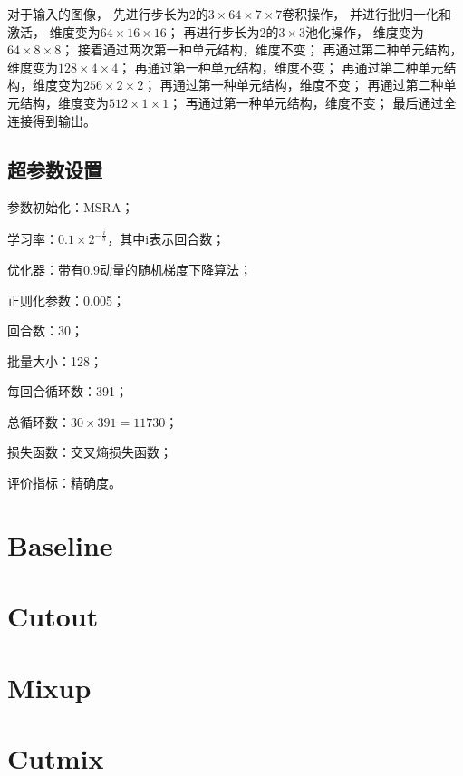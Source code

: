 \documentclass{article}
\begin{document}
对于输入的图像，
先进行步长为2的$3\times64\times7\times7$卷积操作，
并进行批归一化和激活，
维度变为$64\times16\times16$；
再进行步长为2的$3\times3$池化操作，
维度变为$64\times8\times8$；
接着通过两次第一种单元结构，维度不变；
再通过第二种单元结构，维度变为$128\times4\times4$；
再通过第一种单元结构，维度不变；
再通过第二种单元结构，维度变为$256\times2\times2$；
再通过第一种单元结构，维度不变；
再通过第二种单元结构，维度变为$512\times1\times1$；
再通过第一种单元结构，维度不变；
最后通过全连接得到输出。

\subsection{超参数设置}

参数初始化：MSRA；

学习率：$ 0.1 \times 2^{-\frac{i}{5}} $，其中i表示回合数；

优化器：带有0.9动量的随机梯度下降算法；

正则化参数：0.005；

回合数：30；

批量大小：128；

每回合循环数：391；

总循环数：$ 30 \times 391 = 11730 $；

损失函数：交叉熵损失函数；

评价指标：精确度。

\section{Baseline}

\section{Cutout}

\section{Mixup}

\section{Cutmix}
\end{document}

